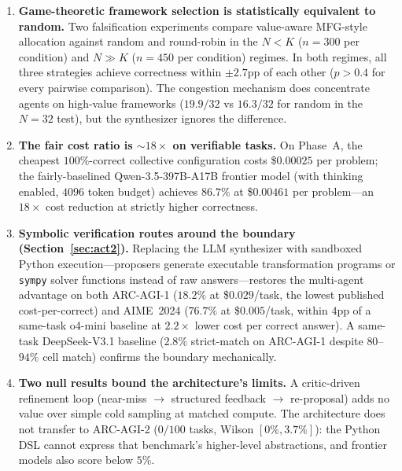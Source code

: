 \documentclass[11pt]{amsart}
\newcommand\1{{\mathds{1}}}
\theoremstyle{definition}
\theoremstyle{remark}
\numberwithin{equation}{section}
\begin{document}
\begin{enumerate}[leftmargin=1.2em, itemsep=2pt]
\item \textbf{Game-theoretic framework selection is statistically equivalent to random.}
Two falsification experiments compare value-aware MFG-style allocation against random and round-robin in the $N\!<\!K$ ($n\!=\!300$ per condition) and $N\!\gg\!K$ ($n\!=\!450$ per condition) regimes.
In both regimes, all three strategies achieve correctness within $\pm 2.7$pp of each other ($p > 0.4$ for every pairwise comparison).
The congestion mechanism does concentrate agents on high-value frameworks ($19.9/32$ vs $16.3/32$ for random in the $N\!=\!32$ test), but the synthesizer ignores the difference.
\item \textbf{The fair cost ratio is $\sim 18\times$ on verifiable tasks.}
On Phase~A, the cheapest $100\%$-correct collective configuration costs \$$0.00025$ per problem; the fairly-baselined Qwen-3.5-397B-A17B frontier model (with thinking enabled, $4096$ token budget) achieves $86.7\%$ at \$$0.00461$ per problem---an $18\times$ cost reduction at strictly higher correctness.
\item \textbf{Symbolic verification routes around the boundary (Section~\ref{sec:act2}).}
Replacing the LLM synthesizer with sandboxed Python execution---proposers generate executable transformation programs or \texttt{sympy} solver functions instead of raw answers---restores the multi-agent advantage on both ARC-AGI-1 ($18.2\%$ at \$$0.029$/task, the lowest published cost-per-correct) and AIME~2024 ($76.7\%$ at \$$0.005$/task, within $4$pp of a same-task o4-mini baseline at $2.2\times$ lower cost per correct answer).
A same-task DeepSeek-V3.1 baseline ($2.8\%$ strict-match on ARC-AGI-1 despite $80$--$94\%$ cell match) confirms the boundary mechanically.
\item \textbf{Two null results bound the architecture's limits.}
A critic-driven refinement loop (near-miss $\to$ structured feedback $\to$ re-proposal) adds no value over simple cold sampling at matched compute.
The architecture does not transfer to ARC-AGI-2 ($0/100$ tasks, Wilson $[0\%, 3.7\%]$): the Python DSL cannot express that benchmark's higher-level abstractions, and frontier models also score below $5\%$.
\end{enumerate}
\end{document}
